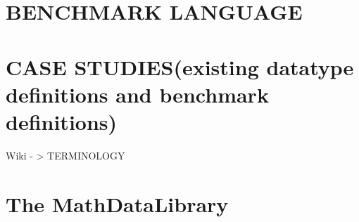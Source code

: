 \documentclass[12pt,twoside]{article}
\begin{document}
		
	\newpage
	
	\par
	

	

	\section{BENCHMARK LANGUAGE}
	
	\section{CASE STUDIES(existing datatype definitions and benchmark definitions)}
	
	Wiki - > TERMINOLOGY
	
	\section{The MathDataLibrary}
	
\end{document}
